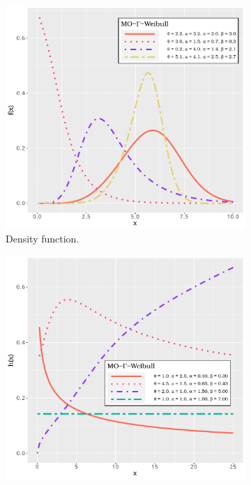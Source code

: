\documentclass[twoside,leqno,11pt]{article}
\begin{document}
\vspace{0.6cm}


\begin{figure}[H]
	\centering
	\begin{subfigure}[b]{0.49\textwidth}
		\centering
		\includegraphics[width=\textwidth]{pdf_function.pdf}
		\caption{Density function.}
		\label{fig:pdf}
	\end{subfigure}
	\hfill
	\begin{subfigure}[b]{0.49\textwidth}
		\centering
		\includegraphics[width=\textwidth]{hazard_function.pdf}

\end{subfigure}
\end{figure}
\end{document}
